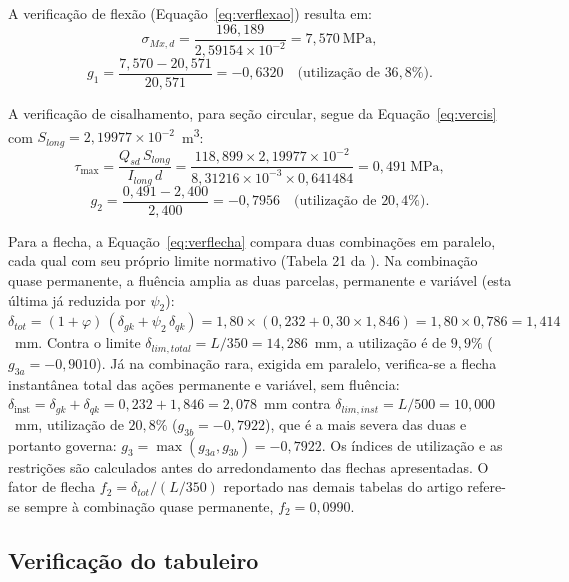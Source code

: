 \begin{appendices}
A verificação de flexão (Equação~\eqref{eq:verflexao}) resulta em:
\begin{equation*}
\sigma_{Mx,d} = \frac{196{,}189}{2{,}59154\times10^{-2}} = 7{,}570~\text{MPa},
\end{equation*}
\begin{equation*}
g_1 = \frac{7{,}570 - 20{,}571}{20{,}571} = -0{,}6320 \quad\text{(utilização de } 36{,}8\%\text{)}.
\end{equation*}

A verificação de cisalhamento, para seção circular, segue da Equação~\eqref{eq:vercis} com $S_{long} = 2{,}19977\times10^{-2}$~m\textsuperscript{3}:
\begin{equation*}
\tau_{\max} = \frac{Q_{sd}\,S_{long}}{I_{long}\,d} = \frac{118{,}899 \times 2{,}19977\times10^{-2}}{8{,}31216\times10^{-3} \times 0{,}641484} = 0{,}491~\text{MPa},
\end{equation*}
\begin{equation*}
g_2 = \frac{0{,}491 - 2{,}400}{2{,}400} = -0{,}7956 \quad\text{(utilização de } 20{,}4\%\text{)}.
\end{equation*}

Para a flecha, a Equação~\eqref{eq:verflecha} compara duas combinações em paralelo, cada qual com seu próprio limite normativo (Tabela 21 da \textcite{NBR7190-1:2022}).
Na combinação quase permanente, a fluência amplia as duas parcelas, permanente e variável (esta última já reduzida por $\psi_2$): $\delta_{tot} = (1+\varphi)\,(\delta_{gk} + \psi_2\,\delta_{qk}) = 1{,}80 \times (0{,}232 + 0{,}30 \times 1{,}846) = 1{,}80 \times 0{,}786 = 1{,}414$~mm.
Contra o limite $\delta_{lim,total} = L/350 = 14{,}286$~mm, a utilização é de $9{,}9\%$ ($g_{3a} = -0{,}9010$).
Já na combinação rara, exigida em paralelo, verifica-se a flecha instantânea total das ações permanente e variável, sem fluência: $\delta_{\mathrm{inst}} = \delta_{gk} + \delta_{qk} = 0{,}232 + 1{,}846 = 2{,}078$~mm contra $\delta_{lim,inst} = L/500 = 10{,}000$~mm, utilização de $20{,}8\%$ ($g_{3b} = -0{,}7922$), que é a mais severa das duas e portanto governa: $g_3 = \max(g_{3a}, g_{3b}) = -0{,}7922$. Os índices de utilização e as restrições são calculados antes do arredondamento das flechas apresentadas.
O fator de flecha $f_2 = \delta_{tot}/(L/350)$ reportado nas demais tabelas do artigo refere-se sempre à combinação quase permanente, $f_2 = 0{,}0990$.

\subsection{Verificação do tabuleiro}


\end{appendices}
